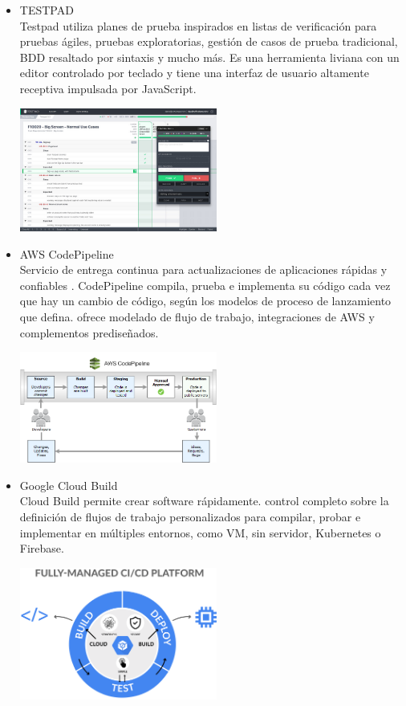 \documentclass[twoside,twocolumn]{article}
\begin{document}
\begin{itemize}
    \item TESTPAD\\
Testpad utiliza planes de prueba inspirados en listas de verificación para pruebas ágiles, pruebas exploratorias, gestión de casos de prueba tradicional, BDD resaltado por sintaxis y mucho más. Es una herramienta liviana con un editor controlado por teclado y tiene una interfaz de usuario altamente receptiva impulsada por JavaScript.
\begin{center}
	\includegraphics[width=6.5cm]{./imagenes/testpad.jpg} 
	\end{center}
    \item AWS CodePipeline\\
Servicio de entrega continua para actualizaciones de aplicaciones rápidas y confiables . CodePipeline compila, prueba e implementa su código cada vez que hay un cambio de código, según los modelos de proceso de lanzamiento que defina. ofrece modelado de flujo de trabajo, integraciones de AWS y complementos prediseñados.\\
\begin{center}
	\includegraphics[width=6.5cm]{./imagenes/pipeline.png} 
	\end{center}
    \item Google Cloud Build\\
 Cloud Build permite crear software rápidamente.  control completo sobre la definición de flujos de trabajo personalizados para compilar, probar e implementar en múltiples entornos, como VM, sin servidor, Kubernetes o Firebase.
 \begin{center}
	\includegraphics[width=6.5cm]{./imagenes/gcb.png} 

\end{center}
\end{itemize}
\end{document}
